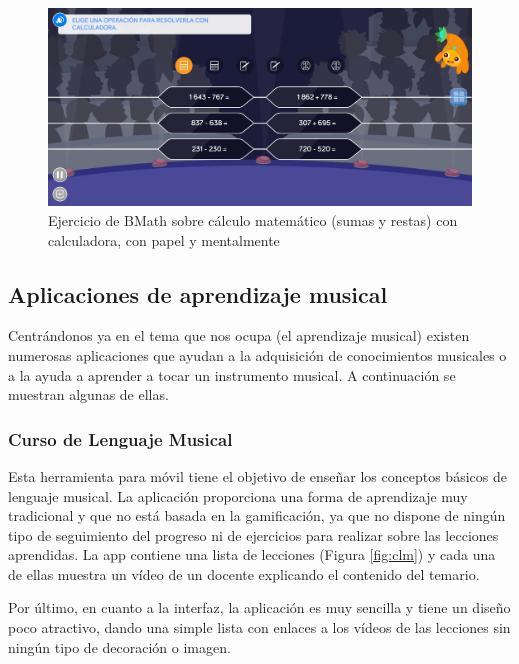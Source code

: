 \begin{figure}[H]
    \centering
    \includegraphics[width=\textwidth]{imagenes/c2/bmath2.jpeg}
    \caption{Ejercicio de BMath sobre cálculo matemático (sumas y restas) con calculadora, con papel y mentalmente}
    \label{fig:bmath2}

\end{figure}


\newpage

\subsection{Aplicaciones de aprendizaje musical}
Centrándonos ya en el tema que nos ocupa (el aprendizaje musical) existen numerosas aplicaciones que ayudan a la adquisición
de conocimientos musicales o a la ayuda a aprender a tocar un instrumento musical. A continuación se muestran algunas de ellas.


\subsubsection{Curso de Lenguaje Musical}
Esta herramienta para móvil tiene el objetivo de enseñar los conceptos básicos de lenguaje musical. La aplicación proporciona una forma de aprendizaje muy 
tradicional y que no está basada en la gamificación, ya que no dispone de ningún tipo de seguimiento del progreso ni de ejercicios para realizar sobre las lecciones aprendidas.
La app contiene una lista de lecciones (Figura \ref{fig:clm}) y cada una de ellas muestra un vídeo de un docente explicando el contenido del temario. 

Por último, en cuanto a la interfaz, la aplicación es muy sencilla y tiene un diseño poco atractivo, dando una simple lista con enlaces
a los vídeos de las lecciones sin ningún tipo de decoración o imagen.

